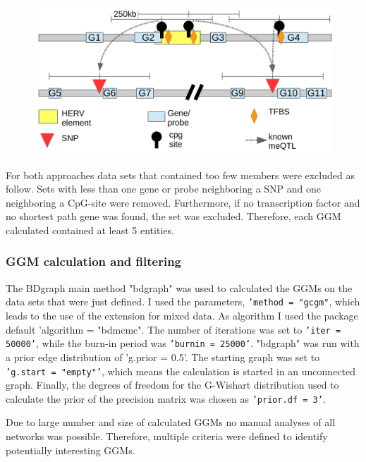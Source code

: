\documentclass[a4paper,12pt,twoside,openright]{article}
\begin{document}
\begin{figure}[b!]
	\includegraphics[scale=0.86, keepaspectratio = true]{../figures/ggm_data_collect_cpg_scheme}
	\caption{}
	\label{fig:ggm.data.collect.cpg.scheme}
\end{figure}

For both approaches data sets that contained too few members were excluded as follow. Sets with less than one gene or probe neighboring a SNP and one neighboring a CpG-site were removed. Furthermore, if no transcription factor and no shortest path gene was found, the set was excluded. Therefore, each GGM calculated contained at least 5 entities.

\subsubsection{GGM calculation and filtering}
\label{Methods:GGM calculation and filtering}
The BDgraph main method "bdgraph" was used to calculated the GGMs on the data sets that were just defined. I used the parameters, \texttt{'method = "gcgm"}, which leads to the use of the extension for mixed data. As algorithm I used the package default 'algorithm = "bdmcmc". The number of iterations was set to \texttt{'iter = 50000'}, while the burn-in period was \texttt{'burnin = 25000'}. "bdgraph" was run with a prior edge distribution of 'g.prior = 0.5'. The starting graph was set to \texttt{'g.start = "empty"'}, which means the calculation is started in an unconnected graph. Finally, the degrees of freedom for the G-Wishart distribution used to calculate the prior of the precision matrix was chosen as \texttt{'prior.df = 3'}.

Due to large number and size of calculated GGMs no manual analyses of all networks was possible. Therefore, multiple criteria were defined to identify potentially interesting GGMs.
\end{document}
